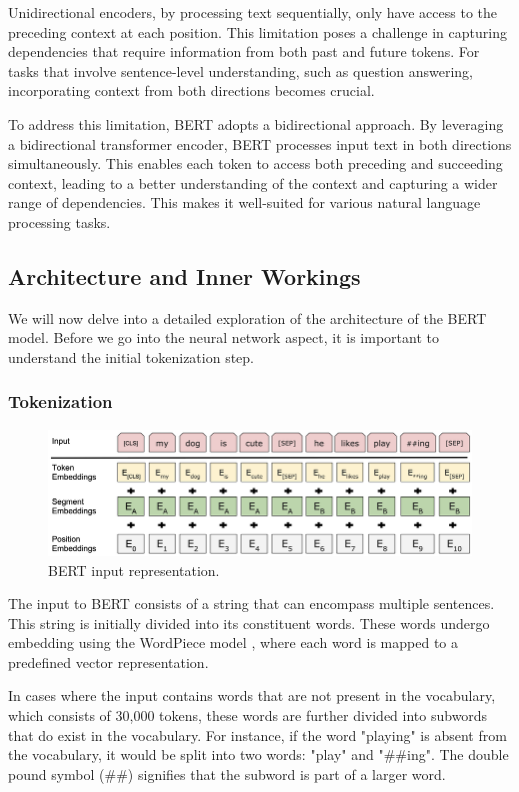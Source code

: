 \documentclass[a4paper,10pt]{report}
\begin{document}
Unidirectional encoders, by processing text sequentially, only have access to the preceding context at each position. This limitation poses a challenge in capturing dependencies that require information from both past and future tokens. For tasks that involve sentence-level understanding, such as question answering, incorporating context from both directions becomes crucial.

To address this limitation, BERT adopts a bidirectional approach. By leveraging a bidirectional transformer encoder, BERT processes input text in both directions simultaneously. This enables each token to access both preceding and succeeding context, leading to a better understanding of the context and capturing a wider range of dependencies. This makes it well-suited for various natural language processing tasks. \cite{bert}


\subsection{Architecture and Inner Workings}
We will now delve into a detailed exploration of the architecture of the BERT model. Before we go into the neural network aspect, it is important to understand the initial tokenization step.

\subsubsection{Tokenization}
\begin{figure}
  \centering
  \includegraphics[width=12cm]{img/bert_input_representation.png}
  \caption{BERT input representation. \cite{bert}}
  \label{fig:bert_architecture}
\end{figure}
The input to BERT consists of a string that can encompass multiple sentences. This string is initially divided into its constituent words. These words undergo embedding using the WordPiece model \cite{wordpiece}, where each word is mapped to a predefined vector representation.

In cases where the input contains words that are not present in the vocabulary, which consists of 30,000 tokens, these words are further divided into subwords that do exist in the vocabulary. For instance, if the word "playing" is absent from the vocabulary, it would be split into two words: "play" and "\#\#ing". The double pound symbol (\#\#) signifies that the subword is part of a larger word.
\end{document}
